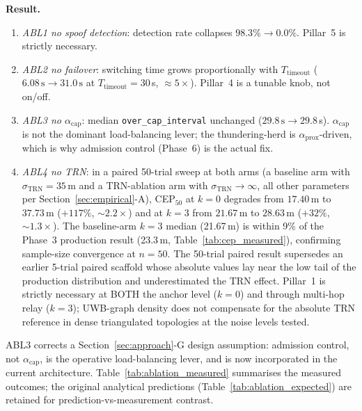 \documentclass[journal,10pt,twocolumn]{IEEEtran}
\begin{document}
\textbf{Result.}
\begin{enumerate}
\item \emph{ABL1 no spoof detection}: detection rate collapses $98.3\% \to 0.0\%$. Pillar~5 is strictly necessary.
\item \emph{ABL2 no failover}: switching time grows proportionally with $T_\text{timeout}$ ($6.08\,\text{s} \to 31.0\,\text{s}$ at $T_\text{timeout}=30$\,s, $\approx 5\times$). Pillar~4 is a tunable knob, not on/off.
\item \emph{ABL3 no $\alpha_\text{cap}$}: median \texttt{over\_cap\_interval} unchanged ($29.8\,\text{s} \to 29.8$\,s). $\alpha_\text{cap}$ is not the dominant load-balancing lever; the thundering-herd is $\alpha_\text{prox}$-driven, which is why admission control (Phase~6) is the actual fix.
\item \emph{ABL4 no TRN}: in a paired 50-trial sweep at both arms (a baseline arm with $\sigma_\text{TRN}=35$\,m and a TRN-ablation arm with $\sigma_\text{TRN}\to\infty$, all other parameters per Section~\ref{sec:empirical}-A), CEP$_{50}$ at $k{=}0$ degrades from $17.40$\,m to $37.73$\,m ($+117\%$, ${\sim}2.2\times$) and at $k{=}3$ from $21.67$\,m to $28.63$\,m ($+32\%$, ${\sim}1.3\times$). The baseline-arm $k{=}3$ median (21.67\,m) is within 9\% of the Phase~3 production result (23.3\,m, Table~\ref{tab:cep_measured}), confirming sample-size convergence at $n{=}50$. The 50-trial paired result supersedes an earlier 5-trial paired scaffold whose absolute values lay near the low tail of the production distribution and underestimated the TRN effect. Pillar~1 is strictly necessary at BOTH the anchor level ($k{=}0$) and through multi-hop relay ($k{=}3$); UWB-graph density does not compensate for the absolute TRN reference in dense triangulated topologies at the noise levels tested.
\end{enumerate}
ABL3 corrects a Section~\ref{sec:approach}-G design assumption: admission control, not $\alpha_\text{cap}$, is the operative load-balancing lever, and is now incorporated in the current architecture. Table~\ref{tab:ablation_measured} summarises the measured outcomes; the original analytical predictions (Table~\ref{tab:ablation_expected}) are retained for prediction-vs-measurement contrast.
\end{document}
